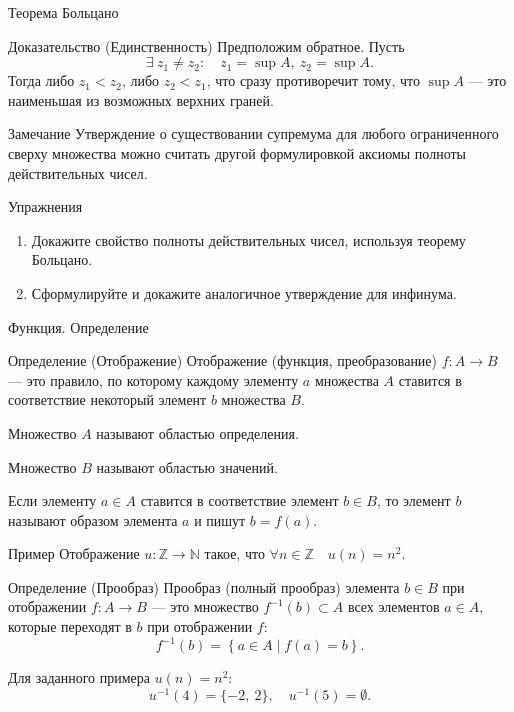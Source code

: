 \documentclass[8pt]{beamer}
\begin{document}
\begin{frame}{Теорема Больцано}

\begin{block}{Доказательство (Единственность)}
Предположим обратное. Пусть
$$\exists\ z_1\ne z_2: \quad z_1=\sup A,\  z_2=\sup A.$$
Тогда либо $z_1<z_2$, либо $z_2<z_1$, что сразу противоречит тому, что $\sup A$ --- это наименьшая из возможных верхних граней.
\end{block}

\begin{block}{Замечание}
Утверждение о существовании супремума для любого ограниченного сверху множества можно считать другой формулировкой аксиомы полноты действительных чисел.
\end{block}

\begin{block}{Упражнения}
\begin{enumerate}
\item Докажите свойство полноты действительных чисел, используя теорему Больцано.
\item Сформулируйте и докажите аналогичное утверждение для инфинума.
\end{enumerate}
\end{block}

\end{frame}

\begin{frame}{Функция. Определение}
\begin{block}{Определение (Отображение)}
Отображение (функция, преобразование) $f: A \rightarrow B$ --- это правило, по которому каждому элементу $a$ множества $A$ ставится в соответствие некоторый элемент $b$ множества $B$.
\end{block}


Множество $A$ называют областью определения.

Множество $B$ называют областью значений.

Если элементу $a\in A$ ставится в соответствие элемент $b\in B$, то элемент $b$ называют образом элемента $a$ и пишут $b=f(a)$.

\begin{block}{Пример} 
Отображение $u: \mathbb{Z} \rightarrow \mathbb{N}$ такое, что $\forall n \in \mathbb{Z} \quad u(n)=n^2$.
\end{block}

\begin{block}{Определение (Прообраз)}
Прообраз (полный прообраз) элемента $b \in B$ при отображении $f: A \rightarrow B$ --- это множество $f^{-1}(b) \subset A$ всех элементов $a \in A$, которые переходят в $b$ при отображении $f$:
$$f^{-1}(b)  = \left\{ a \in A \mid f(a) = b \right\}.$$
\end{block}

Для заданного примера $u(n)=n^2$:
$$u^{-1}(4) = \{ -2,\ 2 \}, \quad u^{-1}(5) = \emptyset.$$
\end{frame}
\end{document}
